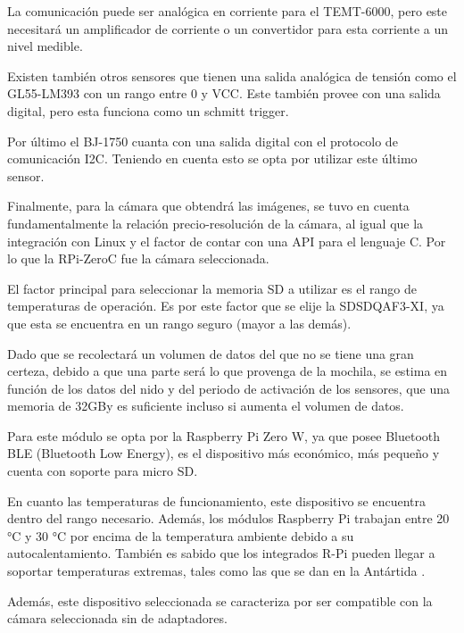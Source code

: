 La comunicación puede ser analógica en corriente para el TEMT-6000, pero este necesitará un amplificador de corriente o un convertidor para esta corriente a un nivel medible.

Existen también otros sensores que tienen una salida analógica de tensión como el GL55-LM393 con un rango entre 0 y VCC. Este también provee con una salida digital, pero esta funciona como un schmitt trigger.

Por último el BJ-1750 cuanta con una salida digital con el protocolo de comunicación I2C. Teniendo en cuenta esto se opta por utilizar este último sensor. 


Finalmente, para la cámara que obtendrá las imágenes, se tuvo en cuenta fundamentalmente la relación precio-resolución de la cámara, al igual que la integración con Linux y el factor de contar con una API para el lenguaje C. Por lo que la RPi-ZeroC fue la cámara seleccionada.


El factor principal para seleccionar la memoria SD a utilizar es el rango de temperaturas de operación. Es por este factor que se elije la SDSDQAF3-XI, ya que esta se encuentra en un rango seguro (mayor a las demás).

Dado que se recolectará un volumen de datos del que no se tiene una gran certeza, debido a que una parte será lo que provenga de la mochila, se estima en función de los datos del nido y del periodo de activación de los sensores, que una memoria de 32GBy es suficiente incluso si aumenta el volumen de datos.


Para este módulo se opta por la Raspberry Pi Zero W, ya que posee Bluetooth BLE (Bluetooth Low Energy), es el dispositivo más económico, más pequeño y cuenta con soporte para micro SD.

En cuanto las temperaturas de funcionamiento, este dispositivo se encuentra dentro del rango necesario. Además, los módulos Raspberry Pi trabajan entre 20 °C y 30 °C por encima de la temperatura ambiente debido a su autocalentamiento. También es sabido que los integrados R-Pi pueden llegar a soportar temperaturas extremas, tales como las que se dan en la Antártida \cite{ref:Penguin}.

Además, este dispositivo seleccionada se caracteriza por ser compatible con la cámara seleccionada sin  de adaptadores.


